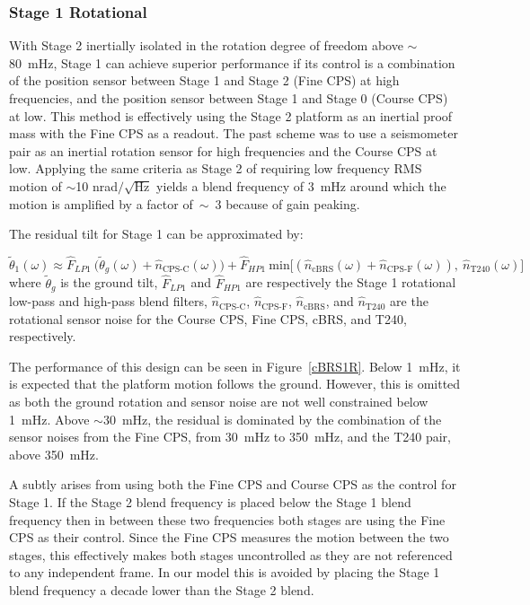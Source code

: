 \documentclass [12pt, proquest]{uwthesis}[2019]
\begin{document}
\subsubsection{Stage 1 Rotational}

With Stage 2 inertially isolated in the rotation degree of freedom above $\sim$80~mHz, Stage 1 can achieve superior performance if its control is a combination of the position sensor between Stage 1 and Stage 2 (Fine CPS) at high frequencies, and the position sensor between Stage 1 and Stage 0 (Course CPS) at low. This method is effectively using the Stage 2 platform as an inertial proof mass with the Fine CPS as a readout. The past scheme was to use a seismometer pair as an inertial rotation sensor for high frequencies and the Course CPS at low. Applying the same criteria as Stage 2 of requiring low frequency RMS motion of $\sim$10 nrad$/\sqrt{\text{Hz}}$ yields a blend frequency of 3~mHz around which the motion is amplified by a factor of~$\sim$~3 because of gain peaking. 

The residual tilt for Stage 1 can be approximated by:

\begin{equation}
\tilde{\theta}_1(\omega)\approx \hat{F}_{LP1}\ \big(\tilde{\theta}_g(\omega)+\hat{n}_\text{CPS-C}(\omega)\big)+\hat{F}_{HP1}\ \text{min}\big[(\hat{n}_\text{cBRS}(\omega)+\hat{n}_\text{CPS-F}(\omega)),\ \hat{n}_\text{T240}(\omega)\big]
\end{equation}
where $\tilde{\theta}_g$ is the ground tilt, $\hat{F}_{LP1}$ and $\hat{F}_{HP1}$ are respectively the Stage 1 rotational low-pass and high-pass blend filters, $\hat{n}_\text{CPS-C}$, $\hat{n}_\text{CPS-F}$, $\hat{n}_\text{cBRS}$, and $\hat{n}_\text{T240}$ are the rotational sensor noise for the Course CPS, Fine CPS, cBRS, and T240, respectively.

The performance of this design can be seen in Figure~\ref{cBRS1R}. Below 1~mHz, it is expected that the platform motion follows the ground. However, this is omitted as both the ground rotation and sensor noise are not well constrained below 1~mHz. Above $\sim$30~mHz, the residual is dominated by the combination of the sensor noises from the Fine CPS, from 30~mHz to 350~mHz, and the T240 pair, above 350~mHz.

A subtly arises from using both the Fine CPS and Course CPS as the control for Stage 1. If the Stage 2 blend frequency is placed below the Stage 1 blend frequency then in between these two frequencies both stages are using the Fine CPS as their control. Since the Fine CPS measures the motion between the two stages, this effectively makes both stages uncontrolled as they are not referenced to any independent frame. In our model this is avoided by placing the Stage 1 blend frequency a decade lower than the Stage 2 blend.
\end{document}
